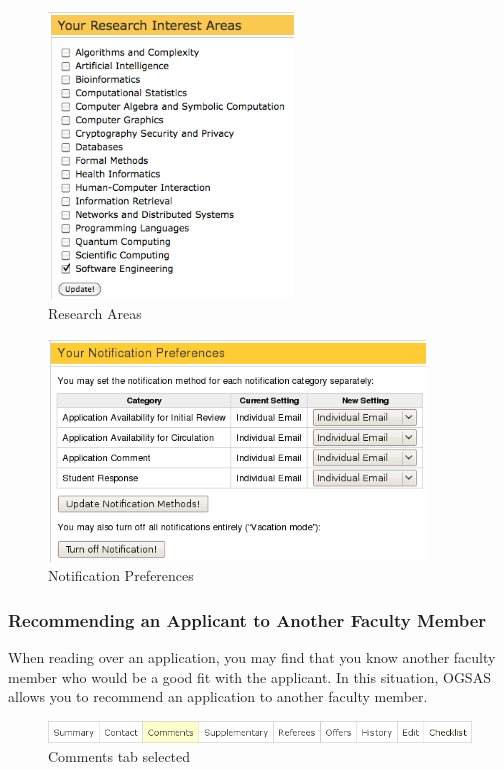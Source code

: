 \documentclass[titlepage]{article}
\begin{document}
\begin{figure}[h!]
  \begin{center}
  \includegraphics[width=6.5cm]{researchareas.png}
  \end{center}
  \caption{Research Areas}
  \label{mResearchAreas}
\end{figure}

\begin{figure}[h!]
  \begin{center}
  \includegraphics[width=10cm]{notificationpreferences.png}
  \end{center}
  \caption{Notification Preferences}
  \label{mNotificationPreferences}
\end{figure}

\subsubsection{Recommending an Applicant to Another Faculty Member}
When reading over an application, you may find that you know another faculty
member who would be a good fit with the applicant. In this situation, OGSAS
allows you to recommend an application to another faculty member.

\begin{figure}[h!]
  \begin{center}
    \includegraphics[width=13cm]{apptabs_comments.png}
  \end{center}
  \caption{Comments tab selected}
  \label{yComments}
\end{figure}
\end{document}
